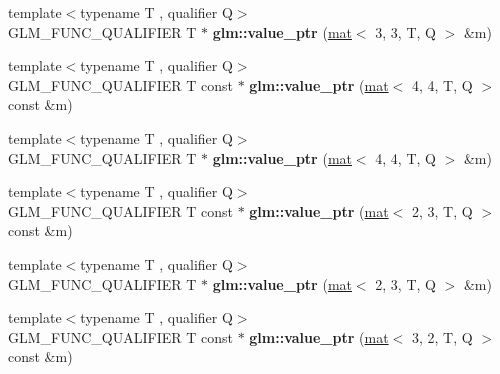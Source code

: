 \begin{DoxyCompactItemize}
\item 
\mbox{\label{group__gtc__type__ptr_ga7bafdd942876d208a5fc34faa4518c36}} 
{\footnotesize template$<$typename T , qualifier Q$>$ }\\G\+L\+M\+\_\+\+F\+U\+N\+C\+\_\+\+Q\+U\+A\+L\+I\+F\+I\+ER T $\ast$ {\bfseries glm\+::value\+\_\+ptr} (\hyperlink{structglm_1_1mat}{mat}$<$ 3, 3, T, Q $>$ \&m)
\item 
\mbox{\label{group__gtc__type__ptr_ga72565b63af29f056843ecd4956b3c738}} 
{\footnotesize template$<$typename T , qualifier Q$>$ }\\G\+L\+M\+\_\+\+F\+U\+N\+C\+\_\+\+Q\+U\+A\+L\+I\+F\+I\+ER T const  $\ast$ {\bfseries glm\+::value\+\_\+ptr} (\hyperlink{structglm_1_1mat}{mat}$<$ 4, 4, T, Q $>$ const \&m)
\item 
\mbox{\label{group__gtc__type__ptr_ga68a08cd646559275950123dfffbdaf55}} 
{\footnotesize template$<$typename T , qualifier Q$>$ }\\G\+L\+M\+\_\+\+F\+U\+N\+C\+\_\+\+Q\+U\+A\+L\+I\+F\+I\+ER T $\ast$ {\bfseries glm\+::value\+\_\+ptr} (\hyperlink{structglm_1_1mat}{mat}$<$ 4, 4, T, Q $>$ \&m)
\item 
\mbox{\label{group__gtc__type__ptr_ga2be1ab45c7a864986baac31557910adb}} 
{\footnotesize template$<$typename T , qualifier Q$>$ }\\G\+L\+M\+\_\+\+F\+U\+N\+C\+\_\+\+Q\+U\+A\+L\+I\+F\+I\+ER T const  $\ast$ {\bfseries glm\+::value\+\_\+ptr} (\hyperlink{structglm_1_1mat}{mat}$<$ 2, 3, T, Q $>$ const \&m)
\item 
\mbox{\label{group__gtc__type__ptr_gab420b07b29bb3bb1cec07b6c31725fef}} 
{\footnotesize template$<$typename T , qualifier Q$>$ }\\G\+L\+M\+\_\+\+F\+U\+N\+C\+\_\+\+Q\+U\+A\+L\+I\+F\+I\+ER T $\ast$ {\bfseries glm\+::value\+\_\+ptr} (\hyperlink{structglm_1_1mat}{mat}$<$ 2, 3, T, Q $>$ \&m)
\item 
\mbox{\label{group__gtc__type__ptr_ga0c9f0f561c848ec89d34977eff6a7b17}} 
{\footnotesize template$<$typename T , qualifier Q$>$ }\\G\+L\+M\+\_\+\+F\+U\+N\+C\+\_\+\+Q\+U\+A\+L\+I\+F\+I\+ER T const  $\ast$ {\bfseries glm\+::value\+\_\+ptr} (\hyperlink{structglm_1_1mat}{mat}$<$ 3, 2, T, Q $>$ const \&m)

\end{DoxyCompactItemize}

